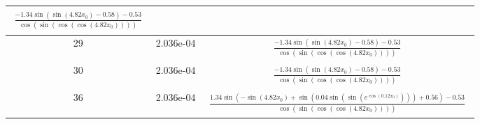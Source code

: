 \begin{center}
\begin{tabular}{|c|c|c|}
$\begin{aligned}\frac{- 1.34 \sin{\left(\sin{\left(4.82 x_{0} \right)} - 0.58 \right)} - 0.53}{\cos{\left(\sin{\left(\cos{\left(\cos{\left(4.82 x_{0} \right)} \right)} \right)} \right)}}\end{aligned}$\\ \hline29 & 2.036e-04 & $\begin{aligned}\frac{- 1.34 \sin{\left(\sin{\left(4.82 x_{0} \right)} - 0.58 \right)} - 0.53}{\cos{\left(\sin{\left(\cos{\left(\cos{\left(4.82 x_{0} \right)} \right)} \right)} \right)}}\end{aligned}$\\ \hline30 & 2.036e-04 & $\begin{aligned}\frac{- 1.34 \sin{\left(\sin{\left(4.82 x_{0} \right)} - 0.58 \right)} - 0.53}{\cos{\left(\sin{\left(\cos{\left(\cos{\left(4.82 x_{0} \right)} \right)} \right)} \right)}}\end{aligned}$\\ \hline36 & 2.036e-04 & $\begin{aligned}\frac{1.34 \sin{\left(- \sin{\left(4.82 x_{0} \right)} + \sin{\left(0.04 \sin{\left(\sin{\left(e^{\cos{\left(0.12 x_{0} \right)}} \right)} \right)} \right)} + 0.56 \right)} - 0.53}{\cos{\left(\sin{\left(\cos{\left(\cos{\left(4.82 x_{0} \right)} \right)} \right)} \right)}}\end{aligned}$\\ \hline\end{tabular}
        \end{center}
        